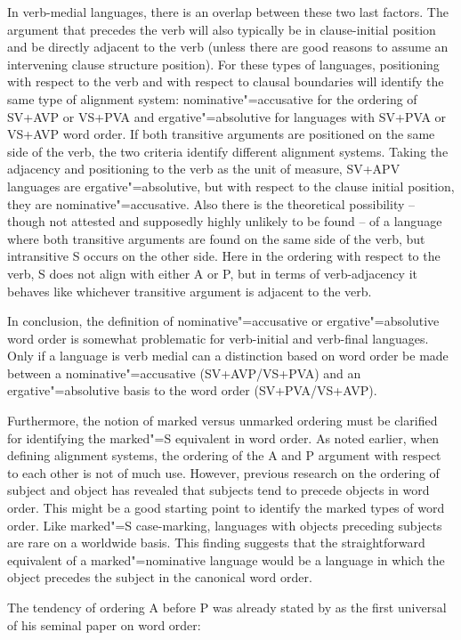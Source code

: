 In verb-medial languages, there is an overlap between these two last factors. 
The argument that precedes the verb will also typically be in clause-initial position and be directly adjacent to the verb (unless there are good reasons to assume an intervening clause structure position). 
For these types of languages, positioning with respect to the verb and with respect to clausal boundaries will identify the same type of alignment system: nominative"=accusative for the ordering of SV+AVP or VS+PVA and ergative"=absolutive for languages with SV+PVA or VS+AVP word order. 
If both transitive arguments are positioned on the same side of the verb, the two criteria identify different alignment systems. 
Taking the adjacency and positioning to the verb as the unit of measure, SV+APV languages are ergative"=absolutive, but with respect to the clause initial position, they are nominative"=accusative. 
Also there is the theoretical possibility -- though not attested and supposedly highly unlikely to be found -- of a language where both transitive arguments are found on the same side of the verb, but intransitive S occurs on the other side. 
Here in the ordering with respect to the verb, S does not align with either A or P, but in terms of verb-adjacency it behaves like whichever transitive argument is adjacent to the verb.

In conclusion, the definition of nominative"=accusative or ergative"=absolutive word order is somewhat problematic for verb-initial and verb-final languages. 
Only if a language is verb medial can a distinction based on word order be made between a nominative"=accusative (SV+AVP/VS+PVA) and an ergative"=absolutive basis to the word order (SV+PVA/VS+AVP).

Furthermore, the notion of marked versus unmarked ordering must be clarified for identifying the marked"=S equivalent in word order.
As noted earlier, when defining alignment systems, the ordering of the A and P argument with respect to each other is not of much use. However, previous research on the ordering of subject and object has revealed that subjects tend to precede objects in word order. 
This might be a good starting point to identify the marked types of word order. Like marked"=S case-marking, languages with objects preceding subjects are rare on a worldwide basis. This finding suggests that the straightforward equivalent of a marked"=nominative language would be a language in which the object precedes the subject in the canonical word order. 

The tendency of ordering A before P was already stated by \citeauthor{Greenberg:1963} as the first universal of his seminal paper on word order: 

